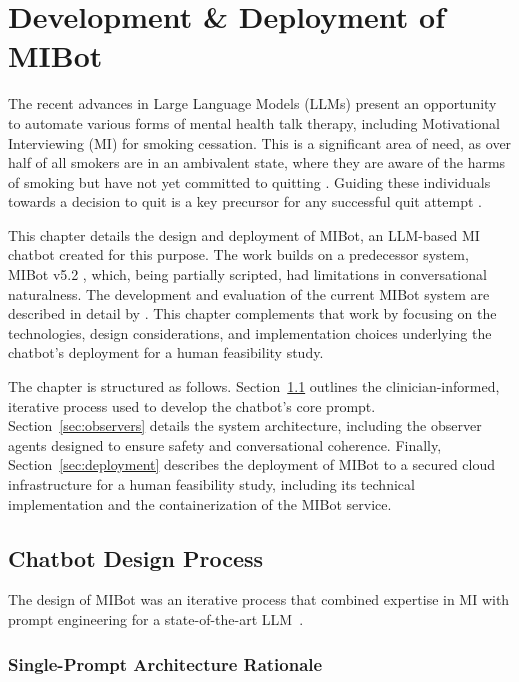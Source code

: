 \chapter{Development \& Deployment of MIBot}
\label{ch:mibot}

The recent advances in Large Language Models (LLMs) present an opportunity to automate various forms of mental health talk therapy, including Motivational Interviewing (MI) for smoking cessation. This is a significant area of need, as over half of all smokers are in an ambivalent state, where they are aware of the harms of smoking but have not yet committed to quitting \citep{Babb2017}. Guiding these individuals towards a decision to quit is a key precursor for any successful quit attempt \citep{West2006}.

This chapter details the design and deployment of MIBot, an LLM-based MI chatbot created for this purpose. The work builds on a predecessor system, MIBot v5.2 \citep{brown2023mi}, which, being partially scripted, had limitations in conversational naturalness. The development and evaluation of the current MIBot system are described in detail by \citet{mahmood-etal-2025-fully}. This chapter complements that work by focusing on the technologies, design considerations, and implementation choices underlying the chatbot's deployment for a human feasibility study.

The chapter is structured as follows. Section~\ref{sec:iterative-development} outlines the clinician-informed, iterative process used to develop the chatbot's core prompt. Section~\ref{sec:observers} details the system architecture, including the observer agents designed to ensure safety and conversational coherence. Finally, Section~\ref{sec:deployment} describes the deployment of MIBot to a secured cloud infrastructure for a human feasibility study, including its technical implementation and the containerization of the MIBot service.




\section{Chatbot Design Process}
\label{sec:iterative-development}

The design of MIBot was an iterative process that combined expertise in MI with prompt engineering for a state-of-the-art LLM~\citep{openai2024gpt4ocard}.

\subsection{Single-Prompt Architecture Rationale}
\label{sec:single-prompt-rationale}

